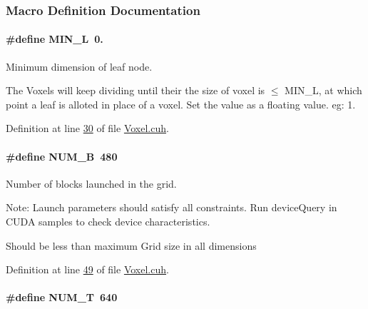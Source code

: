 \subsubsection{Macro Definition Documentation}
\paragraph[{\texorpdfstring{M\+I\+N\+\_\+L}{MIN_L}}]{\setlength{\rightskip}{0pt plus 5cm}\#define M\+I\+N\+\_\+L~0.}\hypertarget{Voxel_8cuh_a29d8f4bb35f9fa62e1d680bc6ab1f4f1}{}\label{Voxel_8cuh_a29d8f4bb35f9fa62e1d680bc6ab1f4f1}


Minimum dimension of leaf node. 

The Voxels will keep dividing until their the size of voxel is $\leq$ M\+I\+N\+\_\+L, at which point a leaf is alloted in place of a voxel. Set the value as a floating value. eg\+: 1. 

Definition at line \hyperlink{Voxel_8cuh_source_l00030}{30} of file \hyperlink{Voxel_8cuh_source}{Voxel.\+cuh}.

\paragraph[{\texorpdfstring{N\+U\+M\+\_\+B}{NUM_B}}]{\setlength{\rightskip}{0pt plus 5cm}\#define N\+U\+M\+\_\+B~480}\hypertarget{Voxel_8cuh_a9f984157d0b56c37dfb4bd1a16f1e8ab}{}\label{Voxel_8cuh_a9f984157d0b56c37dfb4bd1a16f1e8ab}


Number of blocks launched in the grid. 

Note\+: Launch parameters should satisfy all constraints. Run device\+Query in C\+U\+DA samples to check device characteristics.

Should be less than maximum Grid size in all dimensions 

Definition at line \hyperlink{Voxel_8cuh_source_l00049}{49} of file \hyperlink{Voxel_8cuh_source}{Voxel.\+cuh}.

\paragraph[{\texorpdfstring{N\+U\+M\+\_\+T}{NUM_T}}]{\setlength{\rightskip}{0pt plus 5cm}\#define N\+U\+M\+\_\+T~640}\hypertarget{Voxel_8cuh_ad8ba90b2d681fcfbc6cde44271ad6519}{}\label{Voxel_8cuh_ad8ba90b2d681fcfbc6cde44271ad6519}


